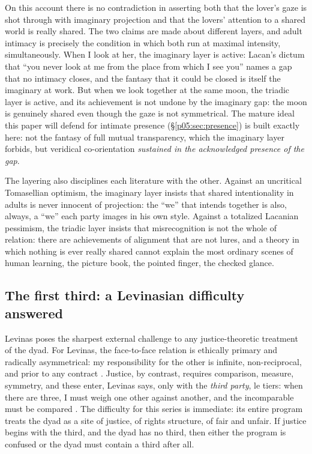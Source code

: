 On this account there is no contradiction in asserting both that the lover's gaze is shot through with imaginary projection and that the lovers' attention to a shared world is really shared. The two claims are made about different layers, and adult intimacy is precisely the condition in which both run at maximal intensity, simultaneously. When I look at her, the imaginary layer is active: Lacan's dictum that ``you never look at me from the place from which I see you'' \parencite{lacan1977xi} names a gap that no intimacy closes, and the fantasy that it could be closed is itself the imaginary at work. But when we look together at the same moon, the triadic layer is active, and its achievement is not undone by the imaginary gap: the moon is genuinely shared even though the gaze is not symmetrical. The mature ideal this paper will defend for intimate presence (§\ref{p05:sec:presence}) is built exactly here: not the fantasy of full mutual transparency, which the imaginary layer forbids, but veridical co-orientation \emph{sustained in the acknowledged presence of the gap}.

The layering also disciplines each literature with the other. Against an uncritical Tomasellian optimism, the imaginary layer insists that shared intentionality in adults is never innocent of projection: the ``we'' that intends together is also, always, a ``we'' each party images in his own style. Against a totalized Lacanian pessimism, the triadic layer insists that misrecognition is not the whole of relation: there are achievements of alignment that are not lures, and a theory in which nothing is ever really shared cannot explain the most ordinary scenes of human learning, the picture book, the pointed finger, the checked glance.

\subsection{The first third: a Levinasian difficulty answered}
\label{p05:sec:third}

Levinas poses the sharpest external challenge to any justice-theoretic treatment of the dyad. For Levinas, the face-to-face relation is ethically primary and radically asymmetrical: my responsibility for the other is infinite, non-reciprocal, and prior to any contract \parencite{levinas1969}. Justice, by contrast, requires comparison, measure, symmetry, and these enter, Levinas says, only with the \emph{third party}, le tiers: when there are three, I must weigh one other against another, and the incomparable must be compared \parencite{levinas1998}. The difficulty for this series is immediate: its entire program treats the dyad as a site of justice, of rights structure, of fair and unfair. If justice begins with the third, and the dyad has no third, then either the program is confused or the dyad must contain a third after all.

